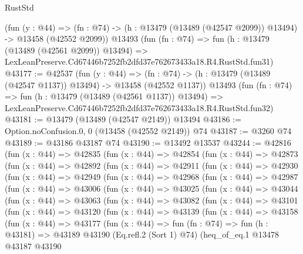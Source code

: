 \begin{lexlean}{RustStd}
\begin{coremodule}
    (fun (y : @44) =>
    (fn : @74) -> (h : @13479 (@13489 (@42547 @2099)) @13494) -> @13458 (@42552 @2099))
    @13493
    (fun (fn : @74) =>
    fun (h : @13479 (@13489 (@42561 @2099)) @13494) =>
    LexLeanPreserve.Cd67446b7252fb2dfd37e762673433a18.R4.RustStd.fun31)
@43177 := @42537
    (fun (y : @44) =>
    (fn : @74) -> (h : @13479 (@13489 (@42547 @1137)) @13494) -> @13458 (@42552 @1137))
    @13493
    (fun (fn : @74) =>
    fun (h : @13479 (@13489 (@42561 @1137)) @13494) =>
    LexLeanPreserve.Cd67446b7252fb2dfd37e762673433a18.R4.RustStd.fun32)
@43181 := @13479 (@13489 (@42547 @2149)) @13494
@43186 := Option.noConfusion.{0, 0} (@13458 (@42552 @2149)) @74
@43187 := @3260 @74
@43189 := @43186 @43187 @74
@43190 := @13492 @13537
@43244 := @42816
    (fun (x : @44) =>
    @42835
      (fun (x : @44) =>
      @42854
        (fun (x : @44) =>
        @42873
          (fun (x : @44) =>
          @42892
            (fun (x : @44) =>
            @42911
              (fun (x : @44) =>
              @42930
                (fun (x : @44) =>
                @42949
                  (fun (x : @44) =>
                  @42968
                    (fun (x : @44) =>
                    @42987
                      (fun (x : @44) =>
                      @43006
                        (fun (x : @44) =>
                        @43025
                          (fun (x : @44) =>
                          @43044
                            (fun (x : @44) =>
                            @43063
                              (fun (x : @44) =>
                              @43082
                                (fun (x : @44) =>
                                @43101
                                  (fun (x : @44) =>
                                  @43120
                                    (fun (x : @44) =>
                                    @43139
                                      (fun (x : @44) =>
                                      @43158
                                        (fun (x : @44) =>
                                        @43177
                                          (fun (x : @44) =>
                                          fun (fn : @74) =>
                                          fun (h : @43181) =>
                                          @43189
                                            @43190
                                            (Eq.refl.{2} (Sort 1) @74)
                                            (heq_of_eq.{1}
                                              @13478
                                              @43187
                                              @43190

\end{coremodule}
\end{lexlean}
